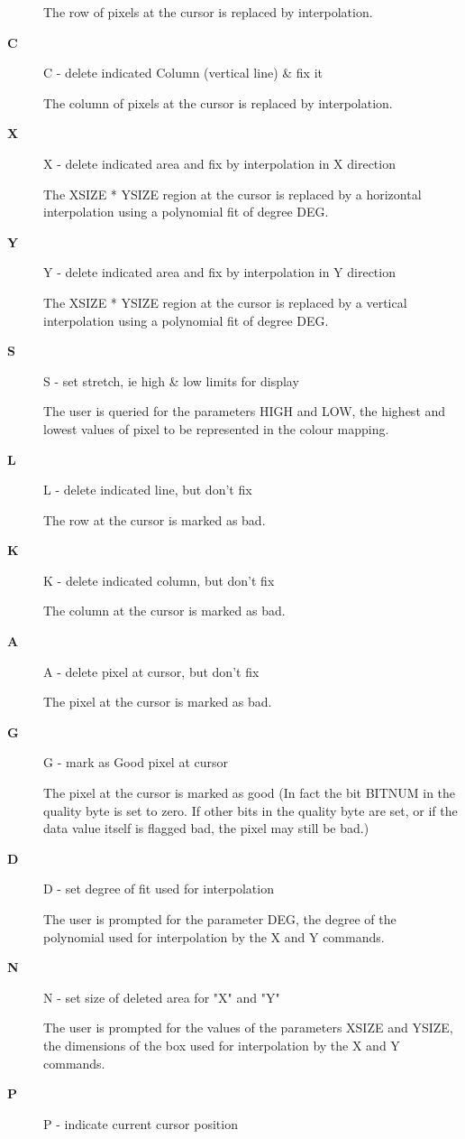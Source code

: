 \begin{description}
    The row of pixels at the cursor is replaced by interpolation.
\item [{\bf C}]
 C - delete indicated Column (vertical line) \& fix it

    The column of pixels at the cursor is replaced by interpolation.
\item [{\bf X}]
 X - delete indicated area and fix by interpolation in X direction

    The XSIZE * YSIZE region at the cursor is replaced by a horizontal
    interpolation using a polynomial fit of degree DEG.
\item [{\bf Y}]
 Y - delete indicated area and fix by interpolation in Y direction

    The XSIZE * YSIZE region at the cursor is replaced by a vertical
    interpolation using a polynomial fit of degree DEG.
\item [{\bf S}]
 S - set stretch, ie high \& low limits for display

    The user is queried for the parameters HIGH and LOW, the highest
    and lowest values of pixel to be represented in the colour mapping.
\item [{\bf L}]
 L - delete indicated line, but don't fix

    The row at the cursor is marked as bad.
\item [{\bf K}]
 K - delete indicated column, but don't fix

    The column at the cursor is marked as bad.
\item [{\bf A}]
 A - delete pixel at cursor, but don't fix

    The pixel at the cursor is marked as bad.
\item [{\bf G}]
 G - mark as Good pixel at cursor

    The pixel at the cursor is marked as good (In fact the bit BITNUM
    in the quality byte is set to zero.  If other bits in the quality
    byte are set, or if the data value itself is flagged bad, the
    pixel may still be bad.)
\item [{\bf D}]
 D - set degree of fit used for interpolation

    The user is prompted for the parameter DEG, the degree of the
    polynomial used for interpolation by the X and Y commands.
\item [{\bf N}]
 N - set size of deleted area for "X" and "Y"

    The user is prompted for the values of the parameters XSIZE and
    YSIZE, the dimensions of the box used for interpolation by the
    X and Y commands.
\item [{\bf P}]
 P - indicate current cursor position


\end{description}
